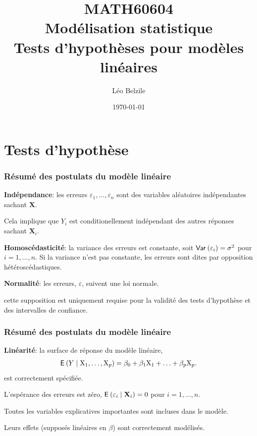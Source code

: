 \documentclass[xcolor={dvipsnames}]{beamer}
\title[\color{white}{MATH60604 \S~2d Tests d'hypothèses pour modèles linéaires}]{MATH60604 \\Modélisation statistique \\ Tests d'hypothèses pour modèles linéaires}
\author{Léo Belzile}
\date{\today}
\institute{HEC Montréal\\
Département de sciences de la décision}
\date{}
\begin{document}
\frame{\titlepage}



\section{Tests d'hypothèse}



\begin{frame}[fragile]
\frametitle{Résumé des postulats du modèle linéaire}
\be
\item \textbf{Indépendance}: les erreurs $\varepsilon_1, \ldots, \varepsilon_n$ sont des variables aléatoires \alert{indépendantes} sachant $\mathbf{X}$.
\bi
\item Cela implique que $Y_i$ est conditionellement indépendant des autres réponses sachant $\mathbf{X}_i$.
\ei
\item \textbf{Homoscédasticité}: la variance des erreurs est  \alert{constante}, soit  ${\mathsf{Var}_{}}\left(\varepsilon_i\right)=\sigma^2$  pour $i=1, \ldots, n$. Si la variance n'est pas constante, les erreurs sont dites par opposition hétéroscédastiques.
\item \textbf{Normalité}: les erreurs, $\varepsilon$, suivent une loi \alert{normale}.
\bi \item cette supposition est uniquement requise pour la validité des tests d'hypothèse et des intervalles de confiance.
\ei
\ee
\end{frame}

\begin{frame}[fragile]
\frametitle{Résumé des postulats du modèle linéaire}
\be
\setcounter{enumi}{3}
\item \textbf{Linéarité}: la surface de réponse du modèle linéaire,
\begin{align*}
{\mathsf E}_{}\left(Y \mid \mathrm{X}_1, \ldots, \mathrm{X}_p\right)=\beta_0+\beta_1\mathrm{X}_1+\ldots + \beta_p \mathrm{X}_p.
\end{align*}
est correctement spécifiée.
\bi \item L'espérance des erreurs est zéro, ${\mathsf E}_{}\left(\varepsilon_i \mid \mathbf{X}_i\right)=0$ pour $i=1,\ldots, n$.
\item Toutes les variables explicatives importantes sont incluses dans le modèle.
\item Leurs effets (supposés linéaires en $\beta$) sont correctement modélisés.
\ei
\ee
\end{frame}
\end{document}
